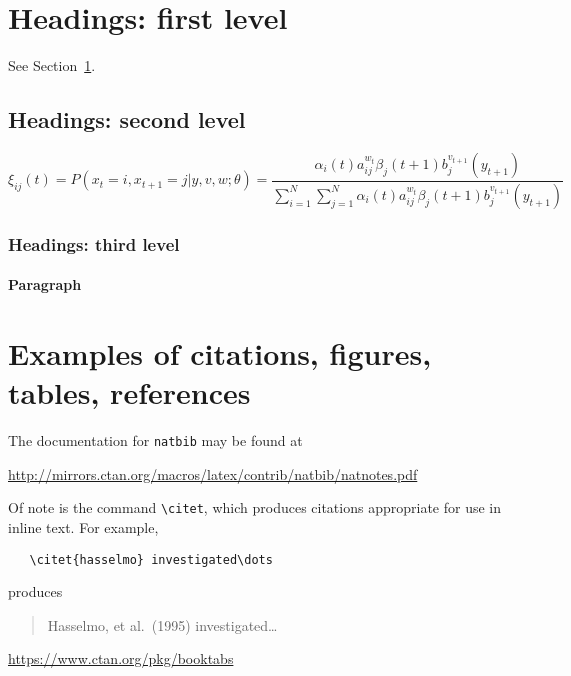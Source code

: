 \section{Headings: first level}
\label{sec:headings}

\lipsum[4] See Section~\ref{sec:headings}.

\subsection{Headings: second level}
\lipsum[5]
\begin{equation}
    \xi _{ij}(t)=P(x_{t}=i,x_{t+1}=j|y,v,w;\theta)= {\frac {\alpha _{i}(t)a^{w_t}_{ij}\beta _{j}(t+1)b^{v_{t+1}}_{j}(y_{t+1})}{\sum _{i=1}^{N} \sum _{j=1}^{N} \alpha _{i}(t)a^{w_t}_{ij}\beta _{j}(t+1)b^{v_{t+1}}_{j}(y_{t+1})}}
\end{equation}

\subsubsection{Headings: third level}
\lipsum[6]

\paragraph{Paragraph}
\lipsum[7]


\section{Examples of citations, figures, tables, references}
\label{sec:others}

The documentation for \verb+natbib+ may be found at
\begin{center}
    \url{http://mirrors.ctan.org/macros/latex/contrib/natbib/natnotes.pdf}
\end{center}
Of note is the command \verb+\citet+, which produces citations
appropriate for use in inline text.
For example,
\begin{verbatim}
   \citet{hasselmo} investigated\dots
\end{verbatim}
produces
\begin{quote}
    Hasselmo, et al.\ (1995) investigated\dots
\end{quote}

\begin{center}
    \url{https://www.ctan.org/pkg/booktabs}
\end{center}

